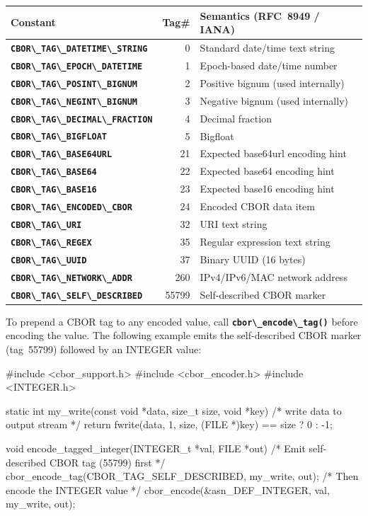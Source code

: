 \documentclass[english,oneside,12pt]{book}
\newcommand{\code}[1]{\texttt{\textbf{\lstinline{#1}}}}
\begin{document}
\begin{tabular}[h!]{lrl}
\textbf{Constant} & \textbf{Tag\#} & \textbf{Semantics (RFC~8949 / IANA)} \\
\hline
\code{CBOR\_TAG\_DATETIME\_STRING}  & 0     & Standard date/time text string \\
\code{CBOR\_TAG\_EPOCH\_DATETIME}   & 1     & Epoch-based date/time number \\
\code{CBOR\_TAG\_POSINT\_BIGNUM}    & 2     & Positive bignum (used internally) \\
\code{CBOR\_TAG\_NEGINT\_BIGNUM}    & 3     & Negative bignum (used internally) \\
\code{CBOR\_TAG\_DECIMAL\_FRACTION} & 4     & Decimal fraction \\
\code{CBOR\_TAG\_BIGFLOAT}          & 5     & Bigfloat \\
\code{CBOR\_TAG\_BASE64URL}         & 21    & Expected base64url encoding hint \\
\code{CBOR\_TAG\_BASE64}            & 22    & Expected base64 encoding hint \\
\code{CBOR\_TAG\_BASE16}            & 23    & Expected base16 encoding hint \\
\code{CBOR\_TAG\_ENCODED\_CBOR}     & 24    & Encoded CBOR data item \\
\code{CBOR\_TAG\_URI}               & 32    & URI text string \\
\code{CBOR\_TAG\_REGEX}             & 35    & Regular expression text string \\
\code{CBOR\_TAG\_UUID}              & 37    & Binary UUID (16 bytes) \\
\code{CBOR\_TAG\_NETWORK\_ADDR}     & 260   & IPv4/IPv6/MAC network address \\
\code{CBOR\_TAG\_SELF\_DESCRIBED}   & 55799 & Self-described CBOR marker \\
\end{tabular}

To prepend a CBOR tag to any encoded value, call \code{cbor\_encode\_tag()}
before encoding the value.  The following example emits the self-described
CBOR marker (tag~55799) followed by an INTEGER value:

\begin{codesample}
#include <cbor_support.h>
#include <cbor_encoder.h>
#include <INTEGER.h>

static int my_write(const void *data, size_t size, void *key) {
    /* write data to output stream */
    return fwrite(data, 1, size, (FILE *)key) == size ? 0 : -1;
}

void encode_tagged_integer(INTEGER_t *val, FILE *out) {
    /* Emit self-described CBOR tag (55799) first */
    cbor_encode_tag(CBOR_TAG_SELF_DESCRIBED, my_write, out);
    /* Then encode the INTEGER value */
    cbor_encode(&asn_DEF_INTEGER, val, my_write, out);
}
\end{codesample}
\end{document}
